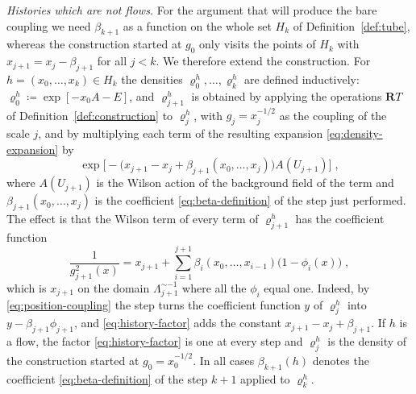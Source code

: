 \documentclass[11pt]{preprint}
\numberwithin{equation}{section}
\theoremstyle{definition}
\theoremstyle{remark}
\theoremstyle{plain}
\begin{document}
\emph{Histories which are not flows.} For the argument that will produce the bare coupling we need $\beta_{k+1}$ as a function on the whole set $H_k$ of Definition~\ref{def:tube}, whereas the construction started at $g_0$ only visits the points of $H_k$ with $x_{j+1} = x_j - \beta_{j+1}$ for all $j < k$. We therefore extend the construction. For $h = (x_0, \dots, x_k) \in H_k$ the densities $\varrho^h_0, \dots, \varrho^h_k$ are defined inductively: $\varrho^h_0 \coloneqq \exp[-x_0A - E]$, and $\varrho^h_{j+1}$ is obtained by applying the operations $\mathbf RT$ of Definition~\ref{def:construction} to $\varrho^h_j$, with $g_j = x_j^{-1/2}$ as the coupling of the scale $j$, and by multiplying each term of the resulting expansion \eqref{eq:density-expansion} by
\begin{equation}\label{eq:history-factor}
    \exp\bigl[-\bigl(x_{j+1} - x_j + \beta_{j+1}(x_0, \dots, x_j)\bigr)A(U_{j+1})\bigr]\;,
\end{equation}
where $A(U_{j+1})$ is the Wilson action of the background field of the term and $\beta_{j+1}(x_0, \dots, x_j)$ is the coefficient \eqref{eq:beta-definition} of the step just performed. The effect is that the Wilson term of every term of $\varrho^h_{j+1}$ has the coefficient function
\begin{equation}\label{eq:history-coupling}
    \frac{1}{g_{j+1}^2(x)} = x_{j+1} + \sum_{i=1}^{j+1}\beta_i(x_0, \dots, x_{i-1})\bigl(1 - \phi_i(x)\bigr)\;,
\end{equation}
which is $x_{j+1}$ on the domain $\Lambda_{j+1}^{\sim-1}$ where all the $\phi_i$ equal one. Indeed, by \eqref{eq:position-coupling} the step turns the coefficient function $y$ of $\varrho^h_j$ into $y - \beta_{j+1}\phi_{j+1}$, and \eqref{eq:history-factor} adds the constant $x_{j+1} - x_j + \beta_{j+1}$. If $h$ is a flow, the factor \eqref{eq:history-factor} is one at every step and $\varrho^h_j$ is the density of the construction started at $g_0 = x_0^{-1/2}$. In all cases $\beta_{k+1}(h)$ denotes the coefficient \eqref{eq:beta-definition} of the step $k + 1$ applied to $\varrho^h_k$.
\end{document}
